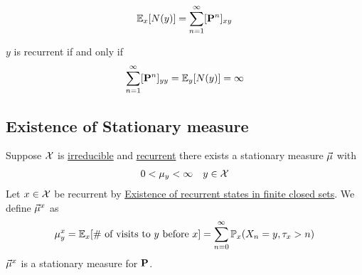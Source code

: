 \documentclass[12pt,a4paper]{article}
\begin{document}
\newpage
\begin{lemma}
    \begin{align*}
        \mathbb{E}_x[N(y)] = \sum\limits_{n=1}^{\infty} [\vb P^n]_{xy}
    \end{align*}
\end{lemma}

\begin{thm}
    $y$ is recurrent if and only if 
    \begin{align*}
        \sum\limits_{n=1}^{\infty} [\vb P^n]_{yy} = \mathbb{E}_y[N(y)] = \infty
    \end{align*}
\end{thm}
\subsection{Existence of Stationary measure}
\begin{thm}\label{thm411}
    Suppose $\cal X$ is \hyperref[irreducible]{irreducible} and \hyperref[recurrent]{recurrent} there  exists a stationary measure $\va\mu$ with 
    \begin{align*}
        0<\mu_y < \infty && y\in \cal X
    \end{align*}
    Let $x\in \cal X$ be recurrent by \hyperref[finiteclosed]{Existence of recurrent states in finite closed sets}. We define $\va\mu^x$ as 
    \begin{align*}
        \mu_y^x = \mathbb{E}_x[\text{\# of visits to $y$ before $x$}] = \sum\limits_{n=0}^{\infty} \mathbb{P}_x(X_n = y, \tau_x > n)
    \end{align*}
    $\va\mu^x$ is a stationary measure for $\vb P$.
\end{thm}

\newpage
\end{document}

